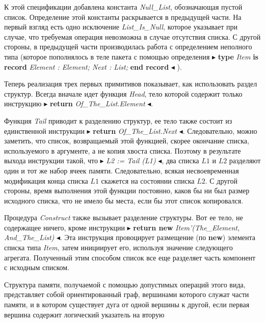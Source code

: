 \documentclass{../../template/mai_book}
\begin{document}
К этой спецификации добавлена константа \textit{Null\_List}, обозначающая пустой список. Определение этой константы раскрывается в предыдущей части. На первый взгляд есть одно исключение \textit{List\_Is\_Null}, которое указывает при случае, что требуемая операция невозможна в случае отсутствия списка. С другой стороны, в предыдущей части производилась работа с определением неполного типа (которое пополнялось в теле пакета с помощью определения $\blacktriangleright$ \textbf{type} \textit{Item} \textbf{is record} \textit{Element : Element; Next : List;} \textbf{end record} $\blacktriangleleft$ ).

Теперь реализация трех первых примитивов показывает, как использовать раздел структур. Всегда вначале идет функция \textit{Head}, тело которой содержит только инструкцию $\blacktriangleright$ \textbf{return} \textit{Of\_The\_List.Element} $\blacktriangleleft$.

Функция \textit{Tail} приводит к разделению структур, ее тело также состоит из единственной инструкции $\blacktriangleright$ \textbf{return} \textit{Of\_The\_List.Next} $\blacktriangleleft$. Следовательно, можно заметить, что список, возвращаемый этой функцией, скорее окончание списка, используемого в аргументе, а не копия хвоста списка. Поэтому в результате выхода инструкции такой, что $\blacktriangleright$ \textit{L2 := Tail (L1)} $\blacktriangleleft$, два списка $L1$ и $L2$ разделяют один и тот же набор ячеек памяти. Следовательно, всякая несвоевременная модификация конца списка $L1$ скажется на состоянии списка $L2$. С другой стороны, время выполнения этой функции постоянно, каков бы ни был размер исходного списка, что не имело бы места, если бы этот список копировался.

Процедура \textit{Construct} также вызывает разделение структуры. Вот ее тело, не содержащее ничего, кроме инструкции $\blacktriangleright$ \textbf{return new} \textit{Item'(\linebreak The\_Element, And\_The\_List)} $\blacktriangleleft$. Эта инструкция провоцирует размещение (по \textbf{new}) элемента списка типа \textit{Item}, затем инициирует его, используя значение следующего агрегата. Полученный этим способом список все еще разделяет часть компонент с исходным списком.

Структура памяти, получаемой с помощью допустимых операций этого вида, представляет собой ориентированный граф, вершинами которого служат части памяти, и в котором существует дуга от одной вершины к другой, если первая вершина содержит логический указатель на вторую \linebreak

\newpage

\end{document}
